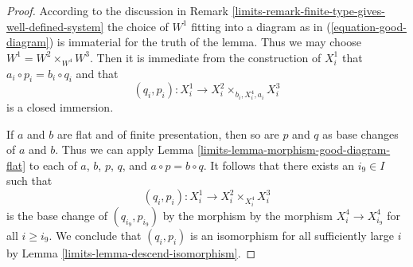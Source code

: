 \begin{proof}

According to the discussion in
Remark \ref{limits-remark-finite-type-gives-well-defined-system}
the choice of $W^1$ fitting into a diagram as in
(\ref{equation-good-diagram}) is immaterial for the truth of
the lemma. Thus we may choose $W^1 = W^2 \times_{W^4} W^3$.
Then it is immediate from the construction of $X^1_i$ that
$a_i \circ p_i = b_i \circ q_i$ and that
$$
(q_i, p_i) : X^1_i \longrightarrow X^2_i \times_{b_i, X^4_i, a_i} X^3_i
$$
is a closed immersion.

\medskip\noindent
If $a$ and $b$ are flat and of finite presentation, then so are
$p$ and $q$ as base changes of $a$ and $b$. Thus we can apply
Lemma \ref{limits-lemma-morphism-good-diagram-flat}
to each of $a$, $b$, $p$, $q$, and $a \circ p = b \circ q$.
It follows that there exists an $i_9 \in I$ such that
$$
(q_i, p_i) : X^1_i \to X^2_i \times_{X^4_i} X^3_i
$$
is the base change of $(q_{i_9}, p_{i_9})$ by the morphism
by the morphism $X^4_i \to X^4_{i_9}$ for all $i \geq i_9$.
We conclude that $(q_i, p_i)$ is an isomorphism for all sufficiently
large $i$ by Lemma \ref{limits-lemma-descend-isomorphism}.
\end{proof}



